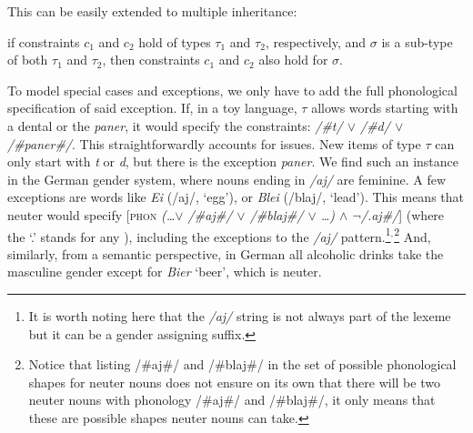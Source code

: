 This can be easily extended to multiple inheritance:

\begin{exe}
    \ex if constraints $c_1$ and $c_2$ hold of types $\tau_1$ and $\tau_2$, respectively, and $\sigma$ is a sub-type of both $\tau_1$ and $\tau_2$, then constraints $c_1$ and $c_2$ also hold for $\sigma$.
\end{exe}

To model special cases and exceptions, we only have to add the full phonological specification of said exception. If, in a toy language, $\tau$ allows words starting with a dental or the  \textit{paner}, it would specify the constraints: \textit{/\#t/ $\lor$ /\#d/ $\lor$ /\#paner\#/}. This straightforwardly accounts for  issues. New items of type $\tau$ can only start with \textit{t} or \textit{d}, but there is the exception \textit{paner}. We find such an instance in the German gender system, where nouns ending in \textit{/aj/} are feminine. A few exceptions are words like \textit{Ei} (/aj/, `egg'), or \textit{Blei} (/blaj/, `lead'). This means that neuter would specify [\textsc{phon} \textit{(\dots  $\lor$ /\#aj\#/ $\lor$ /\#blaj\#/ $\lor$ \dots) $\land$ $\lnot$/.aj\#/}] (where the `.' stands for any ), including the exceptions to the \textit{/aj/} pattern.\footnote{It is worth noting here that the \textit{/aj/} string is not always part of the lexeme but it can be a gender assigning suffix.}$^{,}$\footnote{Notice that listing /\#aj\#/ and /\#blaj\#/ in the set of possible phonological shapes for neuter nouns does not ensure on its own that there will be two neuter nouns with phonology /\#aj\#/ and /\#blaj\#/, it only means that these are possible shapes neuter nouns can take.} And, similarly, from a semantic perspective, in German all alcoholic drinks take the masculine gender except for \textit{Bier} `beer', which is neuter.

